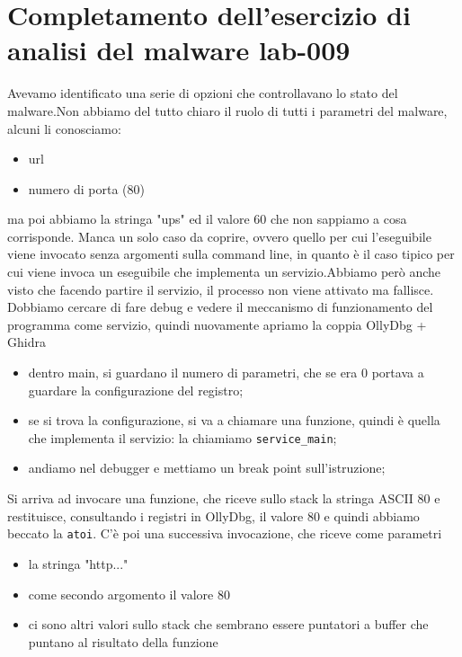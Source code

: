 \documentclass[12pt, oneside]{extbook}
\begin{document}
\section{Completamento dell'esercizio di analisi del malware lab-009}
Avevamo identificato una serie di opzioni che controllavano lo stato del malware.Non abbiamo del tutto chiaro il ruolo di tutti i parametri del malware, alcuni li conosciamo:
\begin{itemize}
\item url
\item numero di porta (80)
\end{itemize}
ma poi abbiamo la stringa "ups" ed il valore 60 che non sappiamo a cosa corrisponde. Manca un solo caso da coprire, ovvero quello per cui l'eseguibile viene invocato senza argomenti sulla command line, in quanto è il caso tipico per cui viene invoca un eseguibile che implementa un servizio.Abbiamo però anche visto che facendo partire il servizio, il processo non viene attivato ma fallisce.\\Dobbiamo cercare di fare debug e vedere il meccanismo di funzionamento del programma come servizio, quindi nuovamente apriamo la coppia OllyDbg + Ghidra
\begin{itemize}
\item dentro main, si guardano il numero di parametri, che se era 0 portava a guardare la configurazione del registro;
\item se si trova la configurazione, si va a chiamare una funzione, quindi è quella che implementa il servizio: la chiamiamo \texttt{service\_main};
\item andiamo nel debugger e mettiamo un break point sull'istruzione;
\end{itemize}
Si arriva ad invocare una funzione, che riceve sullo stack la stringa ASCII 80 e restituisce, consultando i registri in OllyDbg, il valore 80 e quindi abbiamo beccato la \texttt{atoi}. C'è poi una successiva invocazione, che riceve come parametri 
\begin{itemize}
\item la stringa "http..."
\item come secondo argomento il valore 80
\item ci sono altri valori sullo stack che sembrano essere puntatori a buffer che puntano al risultato della funzione
\end{itemize}
\end{document}
